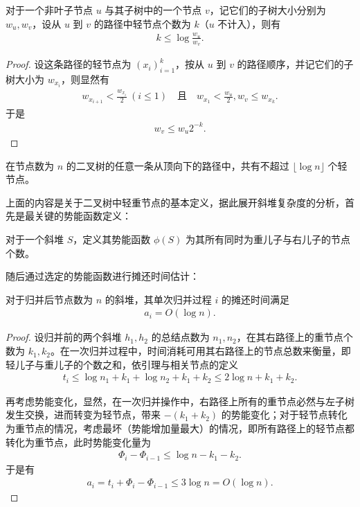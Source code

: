 \documentclass[a4paper]{ctexart}
\begin{document}
\begin{lemma}
    对于一个非叶子节点 $u$ 与其子树中的一个节点 $v$，记它们的子树大小分别为 $w_u,w_v$，设从 $u$ 到 $v$ 的路径中轻节点个数为 $k$（$u$ 不计入），则有 \begin{align*}
        k\le\log\frac{w_u}{w_v}.
    \end{align*}
\end{lemma}
\begin{proof}
    设这条路径的轻节点为 $(x_i)_{i=1}^k$，按从 $u$ 到 $v$ 的路径顺序，并记它们的子树大小为 $w_{x_i}$，则显然有 \begin{align*}
        w_{x_{i+1}}<\frac{w_{x_i}}{2}\ (i\le 1)\quad\text{且}\quad w_{x_1}<\frac{w_u}{2}, w_{v}\le w_{x_k}.
    \end{align*}
    于是 \begin{align*}
        w_{v}\le w_{u}2^{-k}.   
    \end{align*}
\end{proof}
\begin{corollary}
    在节点数为 $n$ 的二叉树的任意一条从顶向下的路径中，共有不超过 $\lfloor \log n\rfloor$ 个轻节点。
\end{corollary}

上面的内容是关于二叉树中轻重节点的基本定义，据此展开斜堆复杂度的分析，首先是最关键的势能函数定义：
\begin{definition}
    对于一个斜堆 $S$，定义其势能函数 $\phi(S)$ 为其所有同时为重儿子与右儿子的节点个数。
\end{definition}
随后通过选定的势能函数进行摊还时间估计：
\begin{theorem}
    对于归并后节点数为 $n$ 的斜堆，其单次归并过程 $i$ 的摊还时间满足 \begin{align*}
        a_i=O(\log n).
    \end{align*}
\end{theorem}
\begin{proof}
    设归并前的两个斜堆 $h_1,h_2$ 的总结点数为 $n_1,n_2$，在其右路径上的重节点个数为 $k_1,k_2$。在一次归并过程中，时间消耗可用其右路径上的节点总数来衡量，即轻儿子与重儿子的个数之和，依引理与相关节点的定义 \begin{align*}
        t_i\le\log n_1+k_1+\log n_2+k_1+k_2\le 2\log n+k_1+k_2.
    \end{align*}
    
    再考虑势能变化，显然，在一次归并操作中，右路径上所有的重节点必然与左子树发生交换，进而转变为轻节点，带来 $-(k_1+k_2)$ 的势能变化；对于轻节点转化为重节点的情况，考虑最坏（势能增加量最大）的情况，即所有路径上的轻节点都转化为重节点，此时势能变化量为 \begin{align*}
        \Phi_i-\Phi_{i-1}\le \log n-k_1-k_2.
    \end{align*}
    于是有 \begin{align*}
        a_i=t_i+\Phi_i-\Phi_{i-1}\le 3\log n=O(\log n).
    \end{align*}
\end{proof}
\end{document}
